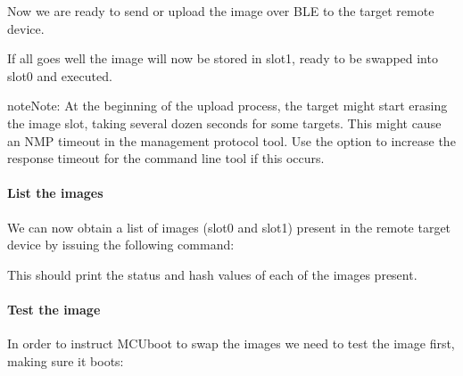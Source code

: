 \documentclass[letterpaper,10pt,english]{sphinxmanual}
\begin{document}
Now we are ready to send or upload the image over BLE to the target remote
device.

\begin{sphinxVerbatim}[commandchars=\\\{\}]
\end{sphinxVerbatim}

If all goes well the image will now be stored in slot\sphinxhyphen{}1, ready to be swapped
into slot\sphinxhyphen{}0 and executed.

\begin{sphinxadmonition}{note}{Note:}
At the beginning of the upload process, the target might start erasing
the image slot, taking several dozen seconds for some targets.  This might
cause an NMP timeout in the management protocol tool. Use the
 option to increase the response timeout for the
 command line tool if this occurs.
\end{sphinxadmonition}


\paragraph{List the images}
\label{\detokenize{fota/smp_svr:list-the-images}}
We can now obtain a list of images (slot\sphinxhyphen{}0 and slot\sphinxhyphen{}1) present in the remote
target device by issuing the following command:

\begin{sphinxVerbatim}[commandchars=\\\{\}]
\end{sphinxVerbatim}

This should print the status and hash values of each of the images present.


\paragraph{Test the image}
\label{\detokenize{fota/smp_svr:test-the-image}}
In order to instruct MCUboot to swap the images we need to test the image first,
making sure it boots:
\end{document}
